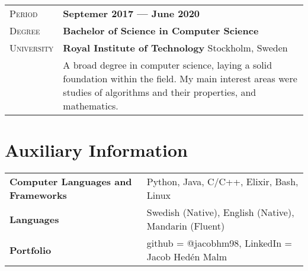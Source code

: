 \documentclass[a4paper, oneside, final]{scrartcl} %
\newcommand{\gray}{\rowcolor[gray]{.90}} %
\begin{document}
\begin{center}
\vspace{12pt}


\begin{tabularx}{0.97\linewidth}{>{\raggedleft\scshape}p{2cm}X}
\gray Period & \textbf{Septemer 2017 ---  June 2020}\\
\gray Degree & \textbf{Bachelor of Science in Computer Science}\\
\gray University & \textbf{Royal Institute of Technology} \hfill Stockholm, Sweden\\
& A broad degree in computer science, laying a solid foundation within the field. My main interest areas were studies of algorithms and their properties, and mathematics.
\end{tabularx}


\section{Auxiliary Information}

\begin{tabular}{ @{} >{\bfseries}l @{\hspace{6ex}} l }
Computer Languages and Frameworks & Python, Java, C/C++, Elixir, Bash, Linux\\
Languages & Swedish (Native), English (Native), Mandarin (Fluent)\\
Portfolio & github = @jacobhm98,  LinkedIn = Jacob Hedén Malm

\end{tabular}

\end{center}
\end{document}
